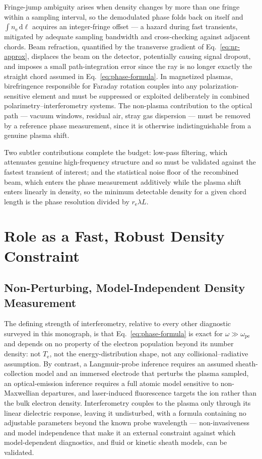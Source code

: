 Fringe-jump ambiguity arises when density changes by more than one fringe within a sampling interval, so the demodulated phase folds back on itself and $\int n_{\mathrm{e}}\,\mathrm{d}\ell$ acquires an integer-fringe offset — a hazard during fast transients, mitigated by adequate sampling bandwidth and cross-checking against adjacent chords. Beam refraction, quantified by the transverse gradient of Eq.~\eqref{eq:nr-approx}, displaces the beam on the detector, potentially causing signal dropout, and imposes a small path-integration error since the ray is no longer exactly the straight chord assumed in Eq.~\eqref{eq:phase-formula}. In magnetized plasmas, birefringence responsible for Faraday rotation couples into any polarization-sensitive element and must be suppressed or exploited deliberately in combined polarimetry--interferometry systems. The non-plasma contribution to the optical path — vacuum windows, residual air, stray gas dispersion — must be removed by a reference phase measurement, since it is otherwise indistinguishable from a genuine plasma shift.

Two subtler contributions complete the budget: low-pass filtering, which attenuates genuine high-frequency structure and so must be validated against the fastest transient of interest; and the statistical noise floor of the recombined beam, which enters the phase measurement additively while the plasma shift enters linearly in density, so the minimum detectable density for a given chord length is the phase resolution divided by $r_{\mathrm{e}}\lambda L$.

\section{Role as a Fast, Robust Density Constraint}
\label{sec:interf-role}

\subsection{Non-Perturbing, Model-Independent Density Measurement}

The defining strength of interferometry, relative to every other diagnostic surveyed in this monograph, is that Eq.~\eqref{eq:phase-formula} is exact for $\omega \gg \omega_{\mathrm{pe}}$ and depends on no property of the electron population beyond its number density: not $T_{\mathrm{e}}$, not the energy-distribution shape, not any collisional--radiative assumption. By contrast, a Langmuir-probe inference requires an assumed sheath-collection model and an immersed electrode that perturbs the plasma sampled, an optical-emission inference requires a full atomic model sensitive to non-Maxwellian departures, and laser-induced fluorescence targets the ion rather than the bulk electron density. Interferometry couples to the plasma only through its linear dielectric response, leaving it undisturbed, with a formula containing no adjustable parameters beyond the known probe wavelength \cite{ref0391} — non-invasiveness and model independence that make it an external constraint against which model-dependent diagnostics, and fluid or kinetic sheath models, can be validated.

